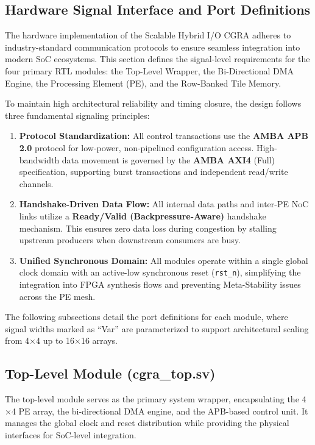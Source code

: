 \subsection{Hardware Signal Interface and Port Definitions}

The hardware implementation of the Scalable Hybrid I/O CGRA adheres to industry-standard communication protocols to ensure seamless integration into modern SoC ecosystems. This section defines the signal-level requirements for the four primary RTL modules: the Top-Level Wrapper, the Bi-Directional DMA Engine, the Processing Element (PE), and the Row-Banked Tile Memory.

To maintain high architectural reliability and timing closure, the design follows three fundamental signaling principles:
\begin{enumerate}
    \item \textbf{Protocol Standardization:} All control transactions use the \textbf{AMBA APB 2.0} protocol for low-power, non-pipelined configuration access. High-bandwidth data movement is governed by the \textbf{AMBA AXI4} (Full) specification, supporting burst transactions and independent read/write channels.
    \item \textbf{Handshake-Driven Data Flow:} All internal data paths and inter-PE NoC links utilize a \textbf{Ready/Valid (Backpressure-Aware)} handshake mechanism. This ensures zero data loss during congestion by stalling upstream producers when downstream consumers are busy.
    \item \textbf{Unified Synchronous Domain:} All modules operate within a single global clock domain with an active-low synchronous reset (\texttt{rst\_n}), simplifying the integration into FPGA synthesis flows and preventing Meta-Stability issues across the PE mesh.
\end{enumerate}
The following subsections detail the port definitions for each module, where signal widths marked as ``Var'' are parameterized to support architectural scaling from 4$\times$4 up to 16$\times$16 arrays.

\subsection{Top-Level Module (cgra\_top.sv)}
The top-level module serves as the primary system wrapper, encapsulating the 4$\times$4 PE array, the bi-directional DMA engine, and the APB-based control unit. It manages the global clock and reset distribution while providing the physical interfaces for SoC-level integration. 


